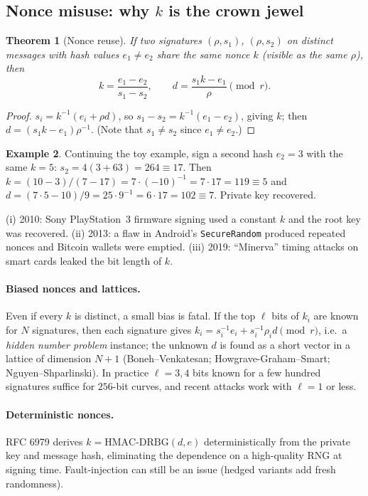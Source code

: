 \documentclass[11pt,a4paper,oneside]{book}
\theoremstyle{plain}
\newtheorem{theorem}{Theorem}[chapter]
\theoremstyle{definition}
\newtheorem{example}[theorem]{Example}
\theoremstyle{remark}
\begin{document}
\subsection{Nonce misuse: why \texorpdfstring{$k$}{k} is the crown jewel}

\begin{theorem}[Nonce reuse]\label{thm:nonce-reuse}
If two signatures $(\rho,s_1)$, $(\rho,s_2)$ on distinct messages with hash values $e_1\ne e_2$ share the same nonce $k$ (visible as the same $\rho$), then
\[
k=\frac{e_1-e_2}{s_1-s_2},\qquad d=\frac{s_1k-e_1}{\rho}\pmod r .
\]
\end{theorem}
\begin{proof}
$s_i=k^{-1}(e_i+\rho d)$, so $s_1-s_2=k^{-1}(e_1-e_2)$, giving $k$; then $d=(s_1k-e_1)\rho^{-1}$. (Note that $s_1\ne s_2$ since $e_1\ne e_2$.)
\end{proof}

\begin{example}
Continuing the toy example, sign a second hash $e_2=3$ with the same $k=5$: $s_2=4(3+63)=264\equiv17$. Then $k=(10-3)/(7-17)=7\cdot(-10)^{-1}=7\cdot17=119\equiv5$ and $d=(7\cdot5-10)/9=25\cdot9^{-1}=6\cdot17=102\equiv7$. Private key recovered.
\end{example}

\begin{warningbox}
(i) 2010: Sony PlayStation~3 firmware signing used a constant $k$ and the root key was recovered. (ii) 2013: a flaw in Android's \texttt{SecureRandom} produced repeated nonces and Bitcoin wallets were emptied. (iii) 2019: ``Minerva'' timing attacks on smart cards leaked the bit length of $k$.
\end{warningbox}

\paragraph{Biased nonces and lattices.} Even if every $k$ is distinct, a small bias is fatal. If the top $\ell$ bits of $k_i$ are known for $N$ signatures, then each signature gives $k_i=s_i^{-1}e_i+s_i^{-1}\rho_id\pmod r$, i.e.\ a \emph{hidden number problem} instance; the unknown $d$ is found as a short vector in a lattice of dimension $N+1$ (Boneh--Venkatesan; Howgrave-Graham--Smart; Nguyen--Shparlinski). In practice $\ell=3,4$ bits known for a few hundred signatures suffice for $256$-bit curves, and recent attacks work with $\ell=1$ or less.

\paragraph{Deterministic nonces.} RFC 6979 derives $k=\mathrm{HMAC\text{-}DRBG}(d,e)$ deterministically from the private key and message hash, eliminating the dependence on a high-quality RNG at signing time. Fault-injection can still be an issue (hedged variants add fresh randomness).
\end{document}
